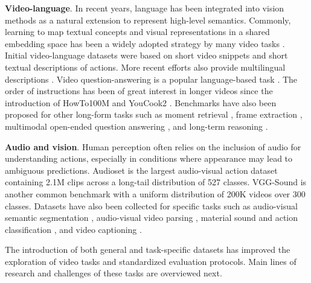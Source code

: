 \noindent
\textbf{Video-language}. In recent years, language has been integrated into vision methods as a natural extension to represent high-level semantics. Commonly, learning to map textual concepts and visual representations in a shared embedding space has been a widely adopted strategy by many video tasks . Initial video-language datasets  were based on short video snippets and short textual descriptions of actions. More recent efforts also provide multilingual descriptions . Video question-answering is a popular language-based task . The order of instructions has been of great interest in longer videos since the introduction of HowTo100M  and YouCook2 . Benchmarks have also been proposed for other long-form tasks such as moment retrieval , frame extraction , multimodal open-ended question answering , and long-term reasoning .

\noindent
\textbf{Audio and vision}. Human perception often relies on the inclusion of audio for understanding actions, especially in conditions where appearance may lead to ambiguous predictions. Audioset  is the largest audio-visual action dataset containing 2.1M clips across a long-tail distribution of 527 classes. VGG-Sound  is another common benchmark with a uniform distribution of 200K videos over 300 classes. Datasets have also been collected for specific tasks such as audio-visual semantic segmentation , audio-visual video parsing , material sound and action classification , and video captioning .

The introduction of both general and task-specific datasets has improved the exploration of video tasks and standardized evaluation protocols. Main lines of research and challenges of these tasks are overviewed next.